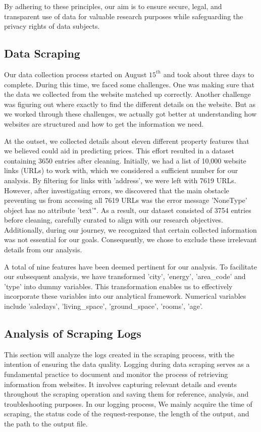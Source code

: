 \documentclass[12pt]{article} %
\begin{document}
{        By adhering to these principles, our aim is to ensure secure, legal, and transparent use of data for valuable research purposes while safeguarding the privacy rights of data subjects.



        \subsection{Data Scraping}
        Our data collection process started on August $15^{th}$ and took about three days to complete. During this time, we faced some challenges. One was making sure that the data we collected from the website matched up correctly. Another challenge was figuring out where exactly to find the different details on the website. But as we worked through these challenges, we actually got better at understanding how websites are structured and how to get the information we need.

        At the outset, we collected details about eleven different property features that we believed could aid in predicting prices. This effort resulted in a dataset containing 3650 entries after cleaning. Initially, we had a list of 10,000 website links (URLs) to work with, which we considered a sufficient number for our analysis. By filtering for links with 'address', we were left with 7619 URLs. However, after investigating errors, we discovered that the main obstacle preventing us from accessing all 7619 URLs was the error message 'NoneType' object has no attribute 'text'". As a result, our dataset consisted of 3754 entries before cleaning, carefully curated to align with our research objectives. Additionally, during our journey, we recognized that certain collected information was not essential for our goals. Consequently, we chose to exclude these irrelevant details from our analysis.
       
        A total of nine features have been deemed pertinent for our analysis. To facilitate our subsequent analysis, we have transformed 'city', 'energy', 'area\_code' and 'type' into dummy variables. This transformation enables us to effectively incorporate these variables into our analytical framework. Numerical variables include 'saledays', 'living\_space', 'ground\_space', 'rooms', 'age'.
       


        \subsection{Analysis of Scraping Logs}
        This section will analyze the logs created in the scraping process, with the intention of ensuring the data quality. Logging during data scraping serves as a fundamental practice to document and monitor the process of retrieving information from websites. It involves capturing relevant details and events throughout the scraping operation and saving them for reference, analysis, and troubleshooting purposes. In our logging process, We mainly acquire the time of scraping, the status code of the request-response, the length of the output, and the path to the output file. 

}
\end{document}

